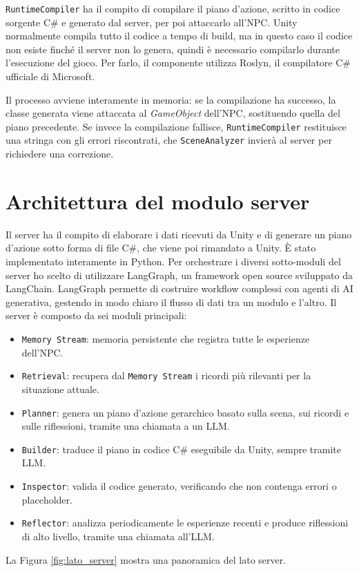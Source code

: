 \texttt{RuntimeCompiler} ha il compito di compilare il piano d'azione, scritto in codice sorgente C\# e generato dal server, per poi attaccarlo all'NPC. Unity normalmente compila tutto il codice a tempo di build, ma in questo caso il codice non esiste finché il server non lo genera, quindi è necessario compilarlo durante l'esecuzione del gioco. Per farlo, il componente utilizza Roslyn, il compilatore C\# ufficiale di Microsoft.

Il processo avviene interamente in memoria: se la compilazione ha successo, la classe generata viene attaccata al \textit{GameObject} dell'NPC, sostituendo quella del piano precedente. Se invece la compilazione fallisce, \texttt{RuntimeCompiler} restituisce una stringa con gli errori riscontrati, che \texttt{SceneAnalyzer} invierà al server per richiedere una correzione.

\section{Architettura del modulo server}

Il server ha il compito di elaborare i dati ricevuti da Unity e di generare un piano d'azione sotto forma di file C\#, che viene poi rimandato a Unity. È stato implementato interamente in Python. Per orchestrare i diversi sotto-moduli del server ho scelto di utilizzare LangGraph, un framework open source sviluppato da LangChain. LangGraph permette di costruire workflow complessi con agenti di AI generativa, gestendo in modo chiaro il flusso di dati tra un modulo e l'altro. Il server è composto da sei moduli principali:

\begin{itemize}
	\item \texttt{Memory Stream}: memoria persistente che registra tutte le esperienze dell'NPC.
	\item \texttt{Retrieval}: recupera dal \texttt{Memory Stream} i ricordi più rilevanti per la situazione attuale.
	\item \texttt{Planner}: genera un piano d'azione gerarchico basato sulla scena, sui ricordi e sulle riflessioni, tramite una chiamata a un LLM.
	\item \texttt{Builder}: traduce il piano in codice C\# eseguibile da Unity, sempre tramite LLM.
	\item \texttt{Inspector}: valida il codice generato, verificando che non contenga errori o placeholder.
	\item \texttt{Reflector}: analizza periodicamente le esperienze recenti e produce riflessioni di alto livello, tramite una chiamata all'LLM.
\end{itemize}
La Figura \ref{fig:lato_server} mostra una panoramica del lato server.

